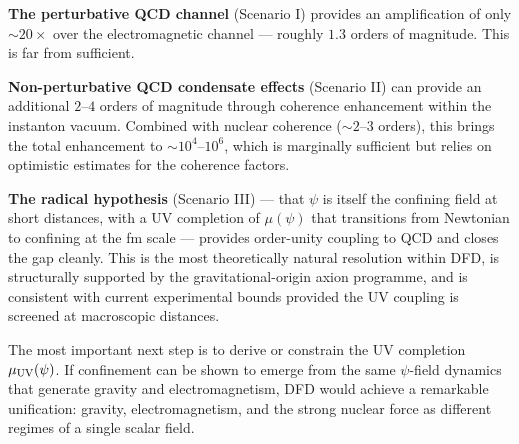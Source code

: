 \documentclass[aps,prd,twocolumn,superscriptaddress,floatfix,nofootinbib]{revtex4-2}
\newcommand{\mufunction}{\mu}
\begin{document}
\textbf{The perturbative QCD channel} (Scenario I) provides an amplification of
only $\sim 20\times$ over the electromagnetic channel --- roughly $1.3$ orders
of magnitude. This is far from sufficient.

\textbf{Non-perturbative QCD condensate effects} (Scenario II) can provide an
additional $2$--$4$ orders of magnitude through coherence enhancement within the
instanton vacuum. Combined with nuclear coherence ($\sim 2$--$3$ orders), this
brings the total enhancement to $\sim 10^4$--$10^6$, which is marginally
sufficient but relies on optimistic estimates for the coherence factors.

\textbf{The radical hypothesis} (Scenario III) --- that $\psi$ is itself the
confining field at short distances, with a UV completion of $\mufunction(\psi)$
that transitions from Newtonian to confining at the fm scale --- provides
order-unity coupling to QCD and closes the gap cleanly. This is the most
theoretically natural resolution within DFD, is structurally supported by the
gravitational-origin axion programme, and is consistent with current experimental
bounds provided the UV coupling is screened at macroscopic distances.

The most important next step is to derive or constrain the UV completion
$\mufunction_{\rm UV}(\psi)$. If confinement can be shown to emerge from the
same $\psi$-field dynamics that generate gravity and electromagnetism, DFD would
achieve a remarkable unification: gravity, electromagnetism, and the strong
nuclear force as different regimes of a single scalar field.
\end{document}
